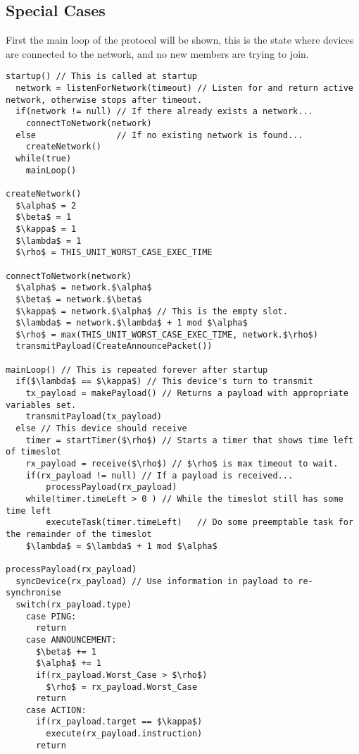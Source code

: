 
\subsection{Special Cases} %
\label{sub:special_cases} 


First the main loop of the protocol will be shown, this is the state where devices are connected to the network, and no new members are trying to join.


\begin{lstlisting}[style=customc,mathescape=true]
startup() // This is called at startup                                           
  network = listenForNetwork(timeout) // Listen for and return active network, otherwise stops after timeout.
  if(network != null) // If there already exists a network...
    connectToNetwork(network)
  else                // If no existing network is found...
    createNetwork()
  while(true)
    mainLoop()
  
createNetwork()
  $\alpha$ = 2
  $\beta$ = 1
  $\kappa$ = 1
  $\lambda$ = 1
  $\rho$ = THIS_UNIT_WORST_CASE_EXEC_TIME
  
connectToNetwork(network)
  $\alpha$ = network.$\alpha$
  $\beta$ = network.$\beta$
  $\kappa$ = network.$\alpha$ // This is the empty slot.
  $\lambda$ = network.$\lambda$ + 1 mod $\alpha$
  $\rho$ = max(THIS_UNIT_WORST_CASE_EXEC_TIME, network.$\rho$)
  transmitPayload(CreateAnnouncePacket())

mainLoop() // This is repeated forever after startup
  if($\lambda$ == $\kappa$) // This device's turn to transmit
  	tx_payload = makePayload() // Returns a payload with appropriate variables set.
  	transmitPayload(tx_payload)
  else // This device should receive
  	timer = startTimer($\rho$) // Starts a timer that shows time left of timeslot
  	rx_payload = receive($\rho$) // $\rho$ is max timeout to wait. 
  	if(rx_payload != null) // If a payload is received...
  	    processPayload(rx_payload)
  	while(timer.timeLeft > 0 ) // While the timeslot still has some time left
  	    executeTask(timer.timeLeft)   // Do some preemptable task for the remainder of the timeslot
  	$\lambda$ = $\lambda$ + 1 mod $\alpha$

processPayload(rx_payload)
  syncDevice(rx_payload) // Use information in payload to re-synchronise
  switch(rx_payload.type)
    case PING:
      return
    case ANNOUNCEMENT:
      $\beta$ += 1
      $\alpha$ += 1
      if(rx_payload.Worst_Case > $\rho$)
        $\rho$ = rx_payload.Worst_Case
      return
    case ACTION:
      if(rx_payload.target == $\kappa$)
        execute(rx_payload.instruction)
      return
\end{lstlisting}